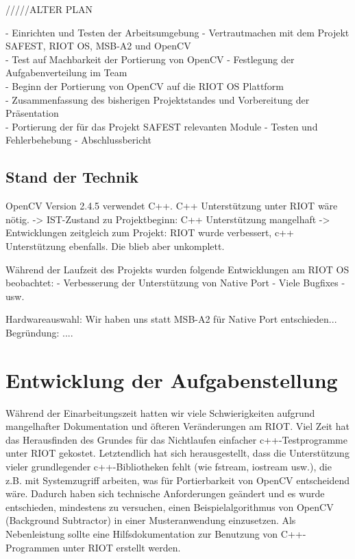 \documentclass[10pt,a4paper]{article}
\begin{document}
/////ALTER PLAN

- Einrichten und Testen der Arbeitsumgebung \newline
- Vertrautmachen mit dem Projekt SAFEST, RIOT OS, MSB-A2 und OpenCV \\
- Test auf Machbarkeit der Portierung von OpenCV \newline
- Festlegung der Aufgabenverteilung im Team \\
- Beginn der Portierung von OpenCV auf die RIOT OS Plattform \\
- Zusammenfassung des bisherigen Projektstandes und Vorbereitung der Präsentation \\
- Portierung der für das Projekt SAFEST relevanten Module \newline
- Testen und Fehlerbehebung \newline
- Abschlussbericht \\ 



\subsection{Stand der Technik}

OpenCV Version 2.4.5 verwendet C++.
C++ Unterstützung unter RIOT wäre nötig.
-> IST-Zustand zu Projektbeginn: C++ Unterstützung mangelhaft
-> Entwicklungen zeitgleich zum Projekt: RIOT wurde verbessert, c++ Unterstützung ebenfalls. Die blieb aber unkomplett.

Während der Laufzeit des Projekts wurden folgende Entwicklungen am RIOT OS beobachtet: 
- Verbesserung der Unterstützung von Native Port
- Viele Bugfixes
- usw.

Hardwareauswahl: Wir haben uns statt MSB-A2 für Native Port entschieden...
Begründung: ....

\newpage
\section{Entwicklung der Aufgabenstellung}
Während der Einarbeitungszeit hatten wir viele Schwierigkeiten aufgrund mangelhafter Dokumentation und öfteren Veränderungen am RIOT. Viel Zeit hat das Herausfinden des Grundes für das Nichtlaufen einfacher c++-Testprogramme unter RIOT gekostet. Letztendlich hat sich herausgestellt, dass die Unterstützung vieler grundlegender c++-Bibliotheken fehlt (wie fstream, iostream usw.), die z.B. mit Systemzugriff arbeiten, was für Portierbarkeit von OpenCV entscheidend wäre. Dadurch haben sich technische Anforderungen geändert und es wurde entschieden, mindestens zu versuchen, einen Beispielalgorithmus von OpenCV (Background Subtractor) in einer Musteranwendung einzusetzen. Als Nebenleistung sollte eine Hilfsdokumentation zur Benutzung von C++-Programmen unter RIOT erstellt werden. 
\end{document}
